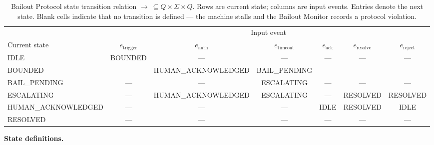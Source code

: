\begin{table}[htbp]
\caption{Bailout Protocol state transition relation $\rightarrow\ \subseteq Q \times \Sigma \times Q$. Rows are current state; columns are input events. Entries denote the next state. Blank cells indicate that no transition is defined — the machine stalls and the Bailout Monitor records a protocol violation.}
\label{tab:bailout-transition}
\begin{tabular}{@{}lcccccc@{}}
\toprule
 & \multicolumn{6}{c}{Input event} \\
\cmidrule(l){2-7}
Current state & $e_{\text{trigger}}$ & $e_{\text{auth}}$ & $e_{\text{timeout}}$ & $e_{\text{ack}}$ & $e_{\text{resolve}}$ & $e_{\text{reject}}$ \\
\midrule
IDLE              & BOUNDED            & --- & --- & --- & --- & --- \\
BOUNDED           & --- & HUMAN\_ACKNOWLEDGED & BAIL\_PENDING & --- & --- & --- \\
BAIL\_PENDING     & --- & --- & ESCALATING & --- & --- & --- \\
ESCALATING        & --- & HUMAN\_ACKNOWLEDGED & ESCALATING & --- & RESOLVED & RESOLVED \\
HUMAN\_ACKNOWLEDGED & --- & --- & --- & IDLE & RESOLVED & IDLE \\
RESOLVED          & --- & --- & --- & --- & --- & --- \\
\bottomrule
\end{tabular}
\end{table}

\bigskip
\noindent\textbf{State definitions.}

